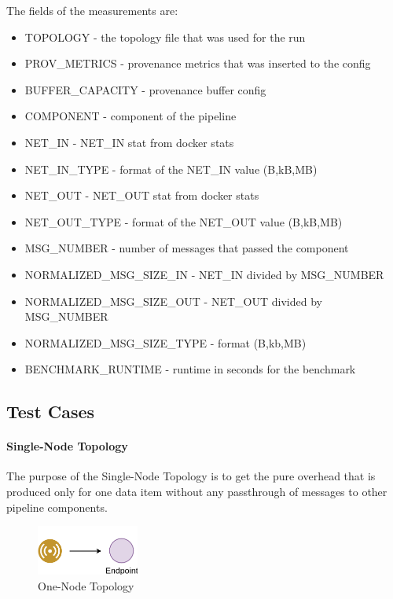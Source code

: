 The fields of the measurements are:

\begin{itemize}
\item TOPOLOGY - the topology file that was used for the run
\item PROV\_METRICS - provenance metrics that was inserted to the config
\item BUFFER\_CAPACITY - provenance buffer config
\item COMPONENT - component of the pipeline
\item NET\_IN - NET\_IN stat from docker stats
\item NET\_IN\_TYPE - format of the NET\_IN value (B,kB,MB) 
\item NET\_OUT - NET\_OUT stat from docker stats
\item NET\_OUT\_TYPE - format of the NET\_OUT value (B,kB,MB) 
\item MSG\_NUMBER - number of messages that passed the component
\item NORMALIZED\_MSG\_SIZE\_IN - NET\_IN divided by MSG\_NUMBER
\item NORMALIZED\_MSG\_SIZE\_OUT - NET\_OUT divided by MSG\_NUMBER
\item NORMALIZED\_MSG\_SIZE\_TYPE - format (B,kb,MB)
\item BENCHMARK\_RUNTIME - runtime in seconds for the benchmark
\end{itemize}



\subsection{Test Cases}
\paragraph*{Single-Node Topology}
The purpose of the Single-Node Topology is to get the pure overhead that is produced only for one data item without any passthrough of messages to other pipeline components.

\begin{figure}[H]
	\center
	\includegraphics[width=0.3\textwidth]{figures/dataoverheadtopolabeled0.png}
	\caption{One-Node Topology}
	\label{fig:onetodetopology}
\end{figure}


